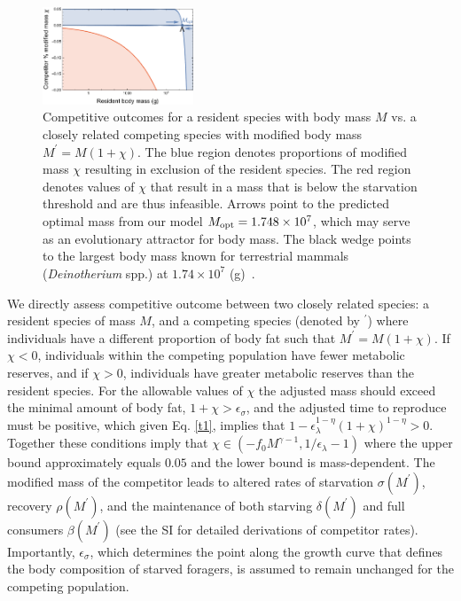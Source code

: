 \documentclass[twocolumn,preprintnumbers,amsmath,amssymb,superscriptaddress]{revtex4}
\begin{document}
\begin{figure}
\centering
\includegraphics[width=0.4\textwidth]{fig_Invasion.eps}
\caption{\small{Competitive outcomes for a resident species with body mass $M$ vs. a closely related competing species with modified body mass $M^\prime=M(1+\chi)$.  
The blue region denotes proportions of modified mass $\chi$ resulting in exclusion of the resident species. 
The red region denotes values of $\chi$ that result in a mass that is below the starvation threshold and are thus infeasible. 
Arrows point to the predicted optimal mass from our model $M_{\rm opt}=1.748\times 10^7$, which may serve as an evolutionary attractor for body mass.
The black wedge points to the largest body mass known for terrestrial mammals (\emph{Deinotherium} spp.) at $1.74\times10^7$ (g)~\citep{Smith:2010p3442}.}\label{fig:invasion}}
\end{figure}

 


We directly assess competitive outcome between two closely related species: a resident species of mass $M$, and a competing species (denoted by $^\prime$) where individuals have a different proportion of body fat such that $M^\prime=M(1+\chi)$.
If $\chi < 0$, individuals within the competing population have fewer metabolic reserves, and if $\chi>0$, individuals have greater metabolic reserves than the resident species.
For the allowable values of $\chi$ the adjusted mass should exceed the minimal amount of body fat, $1+\chi>\epsilon_{\sigma}$, and the adjusted time to reproduce must be positive, which given Eq. \ref{t1}, implies that $1-\epsilon_{\lambda}^{1-\eta}\left(1+\chi\right)^{1-\eta}>0$.
Together these conditions imply that $\chi\in(-f_0M^{\gamma-1},1/\epsilon_{\lambda}-1)$ where the upper bound approximately equals $0.05$ and the lower bound is mass-dependent.
The modified mass of the competitor leads to altered rates of starvation $\sigma(M^\prime)$, recovery $\rho(M^\prime)$, and the maintenance of both starving $\delta(M^\prime)$ and full consumers $\beta(M^\prime)$ (see the SI for detailed derivations of competitor rates).
Importantly, $\epsilon_\sigma$, which determines the point along the growth
curve that defines the body composition of starved foragers, is assumed to
remain unchanged for the competing population.
\end{document}

